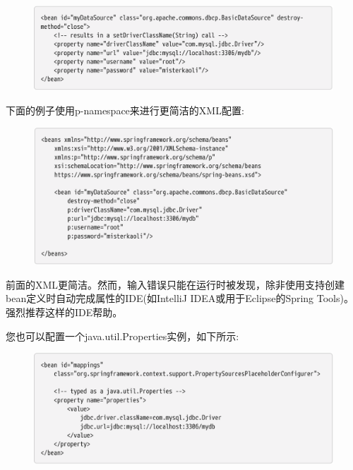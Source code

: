 \begin{figure}[ht]
    \centering
    \includegraphics[width=1\linewidth]{./Figure/IMG_code_32.png}
\end{figure}

下面的例子使用p-namespace来进行更简洁的XML配置:

\begin{figure}[ht]
    \centering
    \includegraphics[width=1\linewidth]{./Figure/IMG_code_33.png}
\end{figure}

前面的XML更简洁。然而，输入错误只能在运行时被发现，除非使用支持创建bean定义时自动完成属性的IDE(如IntelliJ IDEA或用于Eclipse的Spring Tools)。强烈推荐这样的IDE帮助。

\newpage
您也可以配置一个java.util.Properties实例，如下所示:


\begin{figure}[ht]
    \centering
    \includegraphics[width=1\linewidth]{./Figure/IMG_code_34.png}
\end{figure}

